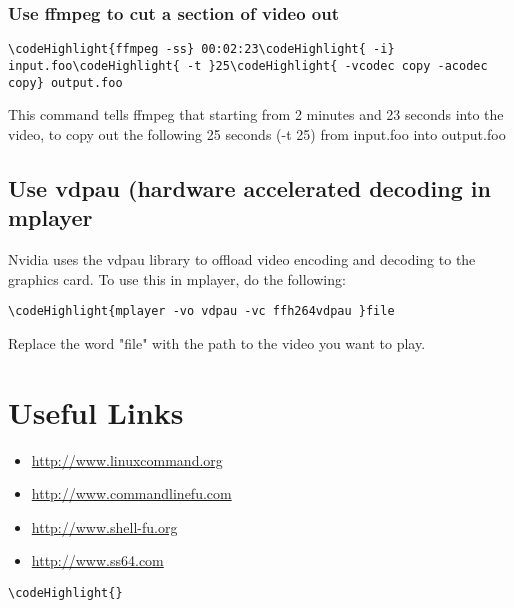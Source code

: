 \documentclass[12pt,a4paper]{article}
\begin{document}
\subsubsection{Use ffmpeg to cut a section of video out}
\begin{Verbatim}[commandchars=\\\{\}]
\codeHighlight{ffmpeg -ss} 00:02:23\codeHighlight{ -i} input.foo\codeHighlight{ -t }25\codeHighlight{ -vcodec copy -acodec copy} output.foo
\end{Verbatim}
This command tells ffmpeg that starting from 2 minutes and 23 seconds into the video, to copy out the following 25 seconds (-t 25) from input.foo into output.foo

\subsection{Use vdpau (hardware accelerated decoding in mplayer}
Nvidia uses the vdpau library to offload video encoding and decoding to the graphics card.  To use this in mplayer, do the following:
\begin{Verbatim}[commandchars=\\\{\}]
\codeHighlight{mplayer -vo vdpau -vc ffh264vdpau }file
\end{Verbatim}
Replace the word "file" with the path to the video you want to play.

\section{Useful Links}
\begin{itemize}
\item{\url{http://www.linuxcommand.org}}
\item{\url{http://www.commandlinefu.com}}
\item{\url{http://www.shell-fu.org}}
\item{\url{http://www.ss64.com}}
\end{itemize}
\begin{Verbatim}[commandchars=\\\{\}]
\codeHighlight{}
\end{Verbatim}
\end{document}
